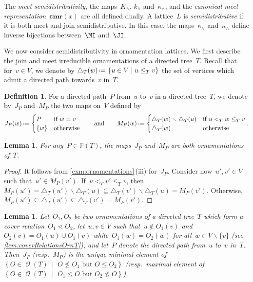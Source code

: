 \documentclass{amsart}
\newtheorem{lemma}[theorem]{Lemma}
\theoremstyle{definition}
\newtheorem{definition}[theorem]{Definition}
\renewcommand{\c}[1]{\mathcal{#1}} %
\newcommand{\set}[2]{\left\{ #1 \;\middle|\; #2 \right\}} %
\newcommand{\ssm}{\smallsetminus} %
\newcommand{\eqdef}{\mbox{\,\raisebox{0.2ex}{\scriptsize\ensuremath{\mathrm:}}\ensuremath{=}\,}} %
\newcommand{\darkblue}{\color{darkblue}} %
\newcommand{\defn}[1]{\textsl{\darkblue #1}} %
\newcommand{\meet}{\wedge} %
\newcommand{\join}{\vee} %
\newcommand{\CMR}{\mathbf{cmr}} %
\DeclareMathOperator{\Orn}{\c{O}}  %
\newcommand{\PP}{\mathbb P} %
\begin{document}
The \defn{meet semidistributivity}, the maps~$K_\meet$, $k_\meet$ and~$\kappa_\meet$, and the \defn{canonical meet representation}~$\CMR(x)$ are all defined dually.
A lattice~$L$ is \defn{semidistributive} if it is both meet and join semidistributive.
In this case, the maps~$\kappa_\join$ and~$\kappa_\meet$ define inverse bijections between~$\MI$ and~$\JI$.

\medskip
We now consider semidistributivity in ornamentation lattices.
We first describe the join and meet irreducible ornamentations of a directed tree~$T$.
Recall that for~$v \in V$, we denote by $\triangle_T(w) \eqdef \set{u \in V}{u \le_T v}$ the set of vertices which admit a directed path towards~$v$ in~$T$.

\begin{definition}
\label{def:irreducibleOrnamentationsT}
For a directed path~$P$ from~$u$ to~$v$ in a directed tree~$T$, we denote by~$J_P$ and~$M_P$ the two maps on~$V$ defined by
\[
J_P(w) \eqdef \begin{cases} P & \text{if } w = v \\ \{w\} & \text{otherwise} \end{cases}
\qquad\text{and}\qquad
M_P(w) \eqdef \begin{cases} \triangle_T(w) \ssm \triangle_T(u) & \text{if } u <_T w \le_T v \\ \triangle_T(w) & \text{otherwise} \end{cases}
.
\]
\end{definition}

\begin{lemma}
For any~$P \in \PP(T)$, the maps~$J_P$ and~$M_P$ are both ornamentations of~$T$.
\end{lemma}

\begin{proof}
It follows from \cref{exm:ornamentations}\,(iii) for~$J_P$.
Consider now~$u', v' \in V$ such that~$u' \in M_P(v')$.
If~$u <_T v' \le_T v$, then~$M_P(u') = \triangle_T(u') \ssm \triangle_T(u) \subseteq \triangle_T(v') \ssm \triangle_T(u) = M_P(v')$.
Otherwise, $M_P(u') \subseteq \triangle_T(u') \subseteq \triangle_T(v') = M_P(v')$.
\end{proof}

\begin{lemma}
\label{lem:semidistributive}
Let~$O_1, O_2$ be two ornamentations of a directed tree~$T$ which form a cover relation~$O_1 \lessdot O_2$, let~$u,v \in V$ such that~$u \notin O_1(v)$ and $O_2(v) = O_1(u) \cup O_1(v)$ while~$O_1(w) = O_2(w)$ for all~${w \in V \ssm \{v\}}$ (see \cref{lem:coverRelationsOrnT}), and let~$P$ denote the directed path from~$u$ to~$v$ in~$T$.
Then~$J_P$ (resp.~$M_P$) is the unique minimal element of~$\set{O \in \Orn(T)}{O \not\le O_1 \text{ but } O \le O_2}$ (resp.~maximal element of~$\set{O \in \Orn(T)}{O_1 \le O \text{ but } O_2 \not\le O}$).
\end{lemma}
\end{document}
